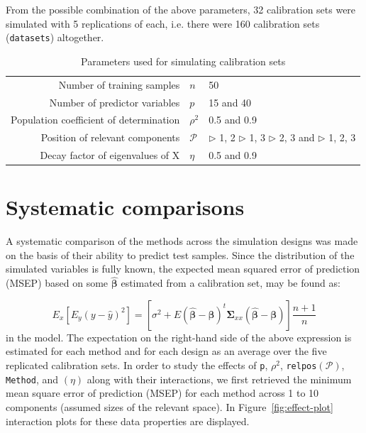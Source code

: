 \documentclass[a4paper, 11pt]{article}
\begin{document}
From the possible combination of the above parameters, 32 calibration sets were simulated with 5 replications of each, i.e. there were 160 calibration sets ({\tt datasets}) altogether.

\bigskip

\begin{table}[ht]
  \centering
  \begin{tabular}{rll}
    Number of training samples              & $n$      & 50                \\
    Number of predictor variables           & $p$      & 15 and 40         \\
    Population coefficient of determination & $\rho^2$ & 0.5 and 0.9       \\
    Position of relevant components         & $\mathcal{P}$
                                            & $\triangleright$ 1, 2 \;
                                                 $\triangleright$ 1,  3 \; \newline
                                                 $\triangleright$ 2,  3 and \;
                                                 $\triangleright$ 1,  2, 3 \\
    Decay factor of eigenvalues of X        & $\eta$   & 0.5 and 0.9
  \end{tabular}
  \caption{Parameters used for simulating calibration sets}
  \label{tab:parameters}
\end{table}
 
\section{Systematic comparisons}

A systematic comparison of the methods across the simulation designs was made on the basis of their ability to predict test samples. Since the distribution of the simulated variables is fully known, the expected mean squared error of prediction (MSEP) based on some $\hat{\bm{\beta}}$ estimated from a calibration set, may be found as:

\begin{equation*}
    E_x\left[E_y\left(y - \hat{y}\right)^2\right] =
    \left[\sigma^2 + E\left(\hat{\bm{\beta}} - \bm{\beta}\right)^t\bm{\Sigma}_{xx}\left(\hat{\bm{\beta}} - \bm{\beta}\right)\right]\frac{n+1}{n}
\end{equation*}
in the model. The expectation on the right-hand side of the above expression is estimated for each method and for each design as an average over the five replicated calibration sets. In order to study the effects of {\tt p}, $\rho^2$, {\tt relpos}$(\mathcal{P})$, {\tt Method}, and $(\eta)$ along with their interactions, we first retrieved the minimum mean square error of prediction (MSEP) for each method across 1 to 10 components (assumed sizes of the relevant space). In Figure~\ref{fig:effect-plot} interaction plots for these data properties are displayed.
\end{document}
